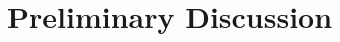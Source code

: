 \documentclass[aps,prb,twocolumn,letterpaper,twoside,nobalancelastpage,groupedaddress,amsmath,amssymb,floatfix,citeautoscript]{revtex4-1}
\begin{document}
\section{Preliminary Discussion}


\end{document}
